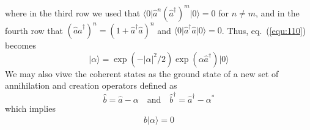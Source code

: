where in the third row we used that
$\langle 0\vert \hat{a}^n(\hat{a}^{\dagger})^m\vert 0\rangle  = 0$ for $n \neq m$, and
in the fourth row that $(\hat{a}\hat{a}^{\dagger})^n = (1+
\hat{a}^{\dagger}\hat{a})^n$ and
$\langle 0\vert \hat{a}^{\dagger}\hat{a}\vert 0\rangle  = 0$. Thus,
eq.~(\ref{equ:110})  becomes
\begin{equation}
  \vert \alpha\rangle  = \exp(-\vert \alpha\vert ^2/2)
  \exp(\alpha\hat{a}^{\dagger})\vert 0\rangle 
  \label{equ:2.112}
\end{equation}
We may also viwe the coherent states as the ground state of
a new set of annihilation and creation operators defined as
\begin{equation}
  \hat{b} = \hat{a} - \alpha \quad \text{and}\quad
  \hat{b}^{\dagger} = \hat{a}^{\dagger} - \alpha^*
  \label{equ:2.113}
\end{equation}
which implies
\begin{equation}
  \hat{b}\vert \alpha\rangle  = 0
  \label{equ:2.114}
\end{equation}


